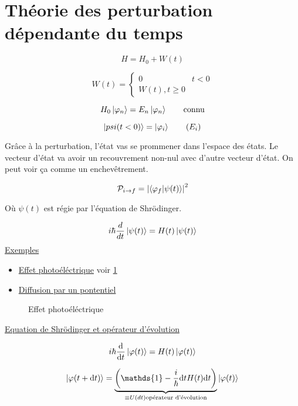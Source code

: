 



\section*{Théorie des perturbation dépendante du temps}

$$H = H_{0} + W(t)$$ 

$$W(t) = \begin{cases}
	0 & t<0\\
	W(t), t \geq 0
\end{cases}$$ 

$$H_{0} \ket{\varphi_{n} } = E_{n} \ket{\varphi_{n} } \qquad \text{connu}$$ 

$$\ket{psi(t<0)} = \ket{\varphi_{i} } \qquad (E_{i})$$ 

Grâce à la perturbation, l'état vas se prommener dans l'espace des états. Le vecteur d'état va avoir un recouvrement non-nul avec d'autre vecteur d'état. On peut voir ça comme un enchevêtrement.

$$\mathcal{P}_{i\to f} = \abs{\bra{\varphi_f}\ket{\psi(t)}}^2 $$

Où $\psi(t)$ est régie par l'équation de Shrödinger.


$$i\hbar \frac{d}{dt} \ket{\psi(t)} = H(t) \ket{\psi(t)}$$ 
\underline{Exemples} 
\begin{itemize}
	
	
	\item	\underline{Effet photoéléctrique} voir \ref{fig:effet-photoéléctrique} 

	\item\underline{Diffusion par un pontentiel} 
	
\end{itemize}
\begin{figure}[h!]
    \centering
    \caption{Effet photoéléctrique}
    \label{fig:effet-photoéléctrique}
\end{figure}

\vspace{1cm}

\underline{Equation de Shrödinger et opérateur d'évolution} 


$$i\hbar \dv{t} \ket{\varphi(t)} = H(t) \ket{\varphi(t)}$$ 

$$\ket{\varphi (t + \dd t)} = \underbrace{\left( \mathds{1} - \frac{i}{\hbar} \dd t  H(t) \dd t \right)}_{\equiv U(dt) \text{opérateur d'évolution}}  \ket{\varphi(t)}$$ 

